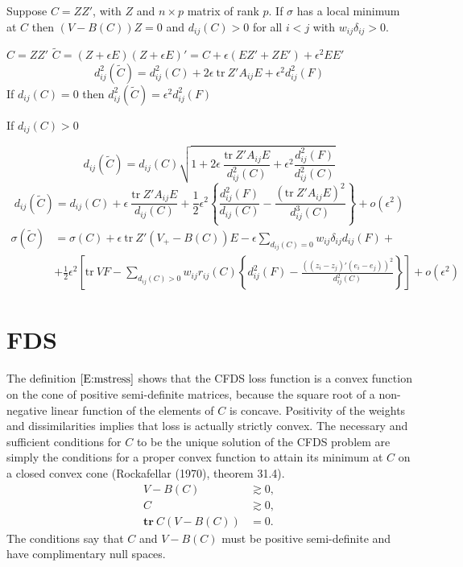 \documentclass[
  12pt,
]{article}
\begin{document}
Suppose \(C=ZZ'\), with \(Z\) and \(n\times p\) matrix of rank \(p\). If
\(\sigma\) has a local minimum at \(C\) then \((V-B(C))Z=0\) and
\(d_{ij}(C)>0\) for all \(i<j\) with \(w_{ij}\delta_{ij}>0\).

\(C=ZZ'\)
\(\tilde C=(Z+\epsilon E)(Z+\epsilon E)'=C+\epsilon(EZ'+ZE')+\epsilon^2 EE'\)
\[
d_{ij}^2(\tilde C)=d_{ij}^2(C)+2\epsilon\ \text{tr}\ Z'A_{ij}E+\epsilon^2d_{ij}^2(F)
\] If \(d_{ij}(C)=0\) then \(d_{ij}^2(\tilde C)=\epsilon^2d_{ij}^2(F)\)

If \(d_{ij}(C)>0\)

\[
d_{ij}(\tilde C)=d_{ij}(C)\sqrt{1+2\epsilon\ \frac{\text{tr}\ Z'A_{ij}E}{d_{ij}^2(C)}+\epsilon^2\frac{d_{ij}^2(F)}{d_{ij}^2(C)}}
\] \[
d_{ij}(\tilde C)=d_{ij}(C)+\epsilon\ \frac{\text{tr}\ Z'A_{ij}E}{d_{ij}(C)}+\frac12\epsilon^2\left\{\frac{d_{ij}^2(F)}{d_{ij}(C)}-\frac{(\text{tr}\ Z'A_{ij}E)^2}{d_{ij}^3(C)}\right\}+o(\epsilon^2)
\] \begin{align*}
\sigma(\tilde C)&=\sigma(C)+\epsilon\ \text{tr}\ Z'(V_+-B(C))E-\epsilon\mathop{\sum}_{d_{ij}(C)=0}w_{ij}\delta_{ij}d_{ij}(F)+\\
&+\frac12\epsilon^2\left[\text{tr}\ VF-\mathop{\sum}_{d_{ij}(C)>0}w_{ij}r_{ij}(C)\left\{d_{ij}^2(F)-\frac{((z_i-z_j)'(e_i-e_j))^2}{d_{ij}^2(C)}\right\}\right]+o(\epsilon^2)
\end{align*}

\section{FDS}\label{fds}

The definition \(\eqref{E:mstress}\) shows that the CFDS loss function
is a convex function on the cone of positive semi-definite matrices,
because the square root of a non-negative linear function of the
elements of \(C\) is concave. Positivity of the weights and
dissimilarities implies that loss is actually strictly convex. The
necessary and sufficient conditions for \(C\) to be the unique solution
of the CFDS problem are simply the conditions for a proper convex
function to attain its minimum at \(C\) on a closed convex cone
(Rockafellar (1970), theorem 31.4). \begin{align*}
V-B(C)&\gtrsim 0,\\
C&\gtrsim 0,\\
\mathbf{tr}\ C(V-B(C))&=0.
\end{align*} The conditions say that \(C\) and \(V-B(C)\) must be
positive semi-definite and have complimentary null spaces.
\end{document}
